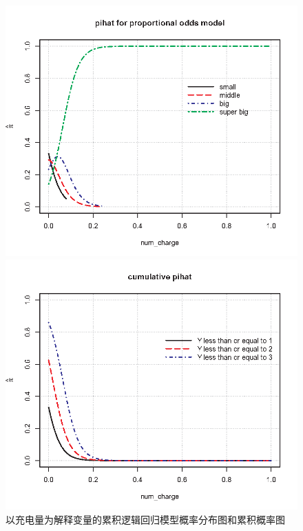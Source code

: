 \documentclass{ctexart}
\begin{document}
\begin{figure}[H]
    \centering
    \begin{minipage}[t]{0.48\textwidth}
        \centering
        \includegraphics[width=\textwidth]{MLR/Figure_propotional.png}
    \end{minipage}
    \begin{minipage}[t]{0.48\textwidth}
        \centering
        \includegraphics[width=\textwidth]{MLR/Figure_cumulative.png}    
    \end{minipage}
    \caption{以充电量为解释变量的累积逻辑回归模型概率分布图和累积概率图}
\end{figure}
\end{document}
